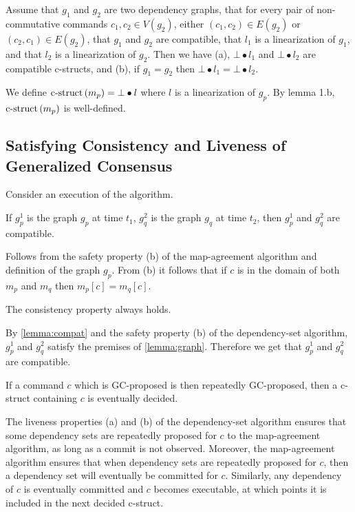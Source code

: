 \begin{mylemma}\label{lemma:graph}
Assume that $g_1$ and $g_2$ are two dependency graphs, 
that for every pair of non-commutative commands $c_1,c_2 \in V\left(g_2\right)$, either $\left( c_1,c_2 \right)\in E\left( g_2 \right)$ or $\left( c_2,c_1 \right)\in E\left( g_2 \right)$,
that $g_1$ and $g_2$ are compatible,
that $l_1$ is a linearization of $g_1$, and that $l_2$ is a linearization of $g_2$. 
Then we have (a), $\bot\bullet l_1$ and $\bot\bullet l_2$ are compatible c-structs, and (b), if $g_1 = g_2$ then $\bot\bullet l_1 = \bot\bullet l_2$.
\end{mylemma}

\begin{mydef}\label{lindef}
We define $\operatorname{c-struct}\left( m_p \right) = \bot\bullet l$ where $l$ is a linearization of $g_p$.
By lemma 1.b, $\operatorname{c-struct}\left( m_p \right)$ is well-defined.
\end{mydef}

\subsection{Satisfying Consistency and Liveness of Generalized Consensus}
Consider an execution of the algorithm.
\begin{mylemma}\label{lemma:compat}
If $g_p^1$ is the graph $g_p$ at time $t_1$, $g_q^2$ is the graph $g_q$ at time $t_2$, then $g_p^1$ and $g_q^2$ are compatible.
\end{mylemma}
\begin{proof*}
Follows from the safety property (b) of the map-agreement algorithm and definition of the graph $g_p$.
From (b) it follows that if $c$ is in the domain of both $m_p$ and $m_q$ then $m_p\left[ c \right] = m_q\left[ c \right]$.
\end{proof*}
\begin{mythm}
    The consistency property always holds.
    \label{lemma:consistency}
\end{mythm}
\begin{proof*}
    By \cref{lemma:compat} and the safety property (b) of the dependency-set algorithm, $g_p^1$ and $g_q^2$ satisfy the premises of \cref{lemma:graph}. Therefore we get that $g_p^1$ and $g_q^2$ are compatible.
\end{proof*}
\begin{mythm}
    If a command $c$ which is GC-proposed is then repeatedly GC-proposed, then a c-struct containing $c$ is eventually decided.
\end{mythm}
\begin{proof*}
    The liveness properties (a) and (b) of the dependency-set algorithm ensures that some dependency sets are repeatedly proposed for $c$ to the map-agreement algorithm, as long as a commit is not observed. Moreover, the map-agreement algorithm ensures that when dependency sets are repeatedly proposed for $c$, then a dependency set will eventually be committed for $c$. Similarly, any dependency of $c$ is eventually committed and $c$ becomes executable, at which points it is included in the next decided c-struct.
\end{proof*}



